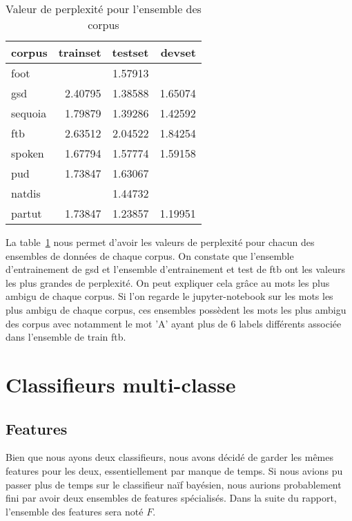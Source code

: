 \documentclass[french, 14pt]{memoir}
\begin{document}
\begin{table}
\begin{center}
\begin{tabular}{|l|r|r|r|}
\hline
corpus & trainset & testset & devset \\
\hline
 foot    &         & 1.57913 &         \\
 gsd     & 2.40795 & 1.38588 & 1.65074 \\
 sequoia & 1.79879 & 1.39286 & 1.42592 \\
 ftb     & 2.63512 & 2.04522 & 1.84254 \\
 spoken  & 1.67794 & 1.57774 & 1.59158 \\
 pud     & 1.73847 & 1.63067 &         \\
 natdis  &         & 1.44732 &         \\
 partut  & 1.73847 & 1.23857 & 1.19951 \\
\hline
\end{tabular}
\end{center}
\caption{Valeur de perplexité pour l'ensemble des corpus}
\label{perplexityTable}
\end{table}

La table~\ref{perplexityTable} nous permet d'avoir les valeurs de perplexité pour chacun des ensembles de données de chaque corpus. On constate que l'ensemble d'entrainement de gsd et l'ensemble d'entrainement et test de ftb ont les valeurs les plus grandes de perplexité. On peut expliquer cela grâce au mots les plus ambigu de chaque corpus. Si l'on regarde le jupyter-notebook sur les mots les plus ambigu de chaque corpus, ces ensembles possèdent les mots les plus ambigu des corpus avec notamment le mot 'A' ayant plus de 6 labels différents associée dans l'ensemble de train ftb.

\chapter{Classifieurs multi-classe}
\section{Features}

Bien que nous ayons deux classifieurs, nous avons décidé de garder les mêmes features pour les deux, essentiellement par manque de temps. Si nous avions pu passer plus de temps sur le classifieur naïf bayésien, nous aurions probablement fini par avoir deux ensembles de features spécialisés. Dans la suite du rapport, l'ensemble des features sera noté $F$.
\end{document}
